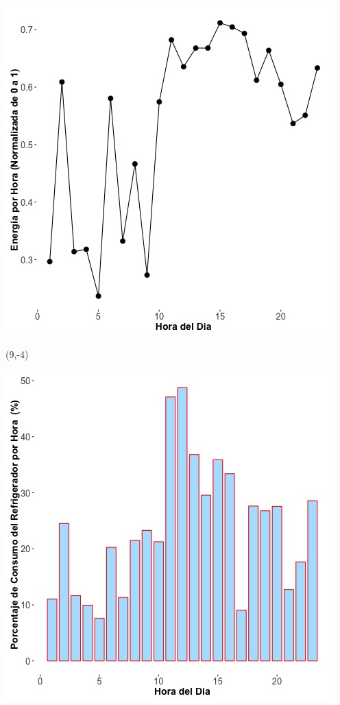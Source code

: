 \documentclass{article}\usepackage[]{graphicx}\usepackage[]{color}
\newenvironment{knitrout}{}{} %
\begin{document}
\begin{knitrout}
\color{fgcolor}
\includegraphics[scale=0.75]{figure/A18_fplot_norm_median} 
\end{knitrout}


 \begin{textblock}{1}(9,-4)
\begin{minipage}{20em}
\begingroup

\endgroup
\end{minipage}
\end{textblock}

 \vspace{2cm}

\begin{knitrout}
\color{fgcolor}
\includegraphics[scale=0.65]{figure/A18_fridge_energy_pct.jpg} 
\end{knitrout}
\end{document}
